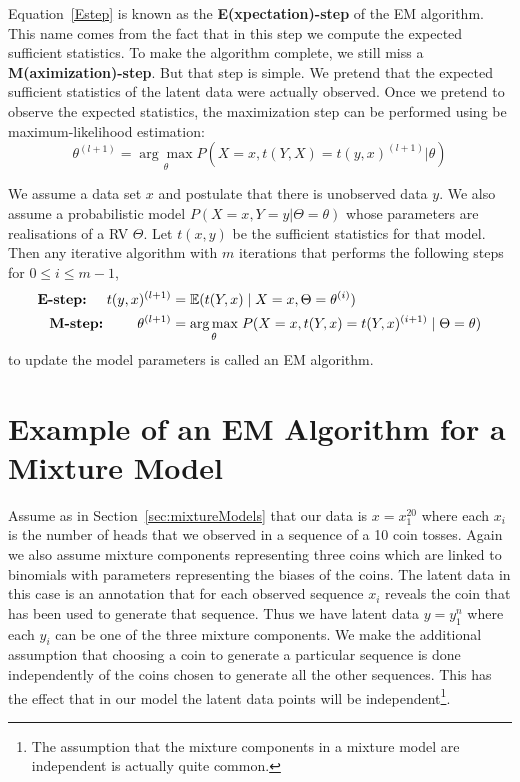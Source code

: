 \documentclass[a4paper,11pt,leqno]{report}\usepackage[]{graphicx}\usepackage[]{color}
\newcommand{\E}{\mathbb{E}}
\begin{document}
Equation~\eqref{Estep} is known as the \textbf{E(xpectation)-step} of the EM algorithm. This name
comes from the fact that in this step we compute the expected sufficient statistics. 
To make the algorithm complete, we still miss a
\textbf{M(aximization)-step}. But that step is simple. We pretend that the expected sufficient statistics of 
the latent data were actually observed. Once we pretend to observe the expected statistics, the maximization 
step can be performed using be maximum-likelihood estimation:
\begin{equation} \label{Mstep}
\theta^{(l+1)} = \underset{\theta}{\arg\max} P(X=x, t(Y,X) = t(y,x)^{(l+1)}|\theta)
\end{equation}

\begin{Definition}[EM algorithm]\label{def:EM}
We assume a data set $ x $ and postulate that there is unobserved data $ y $. We also
assume a probabilistic model $ P(X=x,Y=y|\Theta = \theta) $ whose parameters are realisations of a RV
$ \Theta $. Let $ t(x,y) $ be the sufficient statistics for that model. Then any
iterative algorithm with $ m $ iterations that performs the following
steps for $0\leq i \leq m-1$, 
\begin{align*}
\mbox{\textbf{E-step:} } \quad t(y,x)^{(l+1)} &= \E(t(Y,x) \mid X = x, \Theta = \theta^{(i)}) \\
\mbox{\textbf{M-step:} } \qquad \theta^{(l+1)} &= \underset{\theta}{\arg\max} \; P(X=x, t(Y,x) = t(Y,x)^{(i+1)} \mid \Theta = \theta) 
\end{align*}
to update the model parameters is called an EM algorithm. 
\end{Definition}

\section{Example of an EM Algorithm for a Mixture Model}

Assume as in Section~\ref{sec:mixtureModels} that our data is $ x=x^{20}_{1} $ where each $ x_{i} $ is the 
number of heads that we observed in a sequence of a 10 coin tosses. Again we also assume mixture components representing three coins which are linked
to binomials with parameters representing the biases of the coins. 
The latent data in this case is an annotation that for each observed sequence $ x_{i} $ reveals the coin that has been used
to generate that sequence. Thus we have latent data $ y=y_{1}^{n} $ where each $ y_{i} $ can be one of the three mixture components. 
We make the additional assumption that choosing a coin to generate a particular sequence is done independently of the coins chosen
to generate all the other sequences. This has the effect that in our model the latent data points will be independent\footnote{The assumption
that the mixture components in a mixture model are independent is actually quite common.}.
\end{document}
